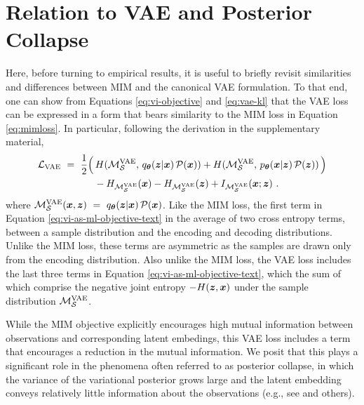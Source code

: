 \section{Relation to VAE and Posterior Collapse}
\label{sec:posterior-collapse}

Here, before turning to empirical results, it is useful to briefly revisit 
similarities and differences between MIM and the canonical VAE formulation. 
To that end, one can show from Equations \eqref{eq:vi-objective}
and \eqref{eq:vae-kl} that the VAE loss can be expressed in a form
that bears similarity to the MIM loss in Equation \eqref{eq:mimloss}.
In particular, following the derivation in the supplementary material,
\begin{equation}
\begin{aligned}
\mathcal{L}_\text{VAE} ~=~
\frac{1}{2} & \Big( \, H(\mathcal{M}_{\mathcal{S}}^\mathrm{VAE}, \,q_{{\boldsymbol \theta}}({\boldsymbol z}|{\boldsymbol{x}})\,\mathcal{P}({\boldsymbol{x}}))
+ H(\mathcal{M}_{\mathcal{S}}^\mathrm{VAE},\, p_{{\boldsymbol \theta}}({\boldsymbol{x}}|{\boldsymbol z})\,\mathcal{P}({\boldsymbol z})) \, \Big) 
\\
& ~~ - H_{\mathcal{M}_{\mathcal{S}}^\mathrm{VAE}}({\boldsymbol{x}}) - H_{\mathcal{M}_{\mathcal{S}}^\mathrm{VAE}}({\boldsymbol z}) + I_{\mathcal{M}_{\mathcal{S}}^\mathrm{VAE}}({\boldsymbol{x}};{\boldsymbol z})  ~.
\label{eq:vi-as-ml-objective-text}
\end{aligned}
\end{equation}
where $\mathcal{M}_{\mathcal{S}}^\mathrm{VAE}({\boldsymbol{x}},{\boldsymbol z}) ~=~ q_{{\boldsymbol \theta}}({\boldsymbol z}|{\boldsymbol{x}})\, \mathcal{P} ({\boldsymbol{x}})$.
Like the MIM loss, the first term in Equation \eqref{eq:vi-as-ml-objective-text}
in the average of two cross entropy terms, between a sample distribution 
and the encoding and decoding distributions. Unlike the MIM loss, these 
terms are asymmetric as the samples are drawn only from the encoding 
distribution. Also unlike the MIM loss, the VAE loss includes the 
last three terms in Equation \eqref{eq:vi-as-ml-objective-text}, 
which the sum of which comprise the negative joint entropy $-H({\boldsymbol z},{\boldsymbol{x}})$ 
under the sample distribution $\mathcal{M}_{\mathcal{S}}^\mathrm{VAE}$.

While the MIM objective explicitly encourages high mutual information 
between observations and corresponding latent embedings, this VAE loss 
includes a term that encourages a reduction in the mutual information. 
We posit that this plays a significant role in the phenomena often 
referred to as posterior collapse, in which the variance of the variational 
posterior grows large and the latent embedding conveys relatively little 
information about the observations  (e.g., see \citep{ChenKSDDSSA16} 
and others).  

